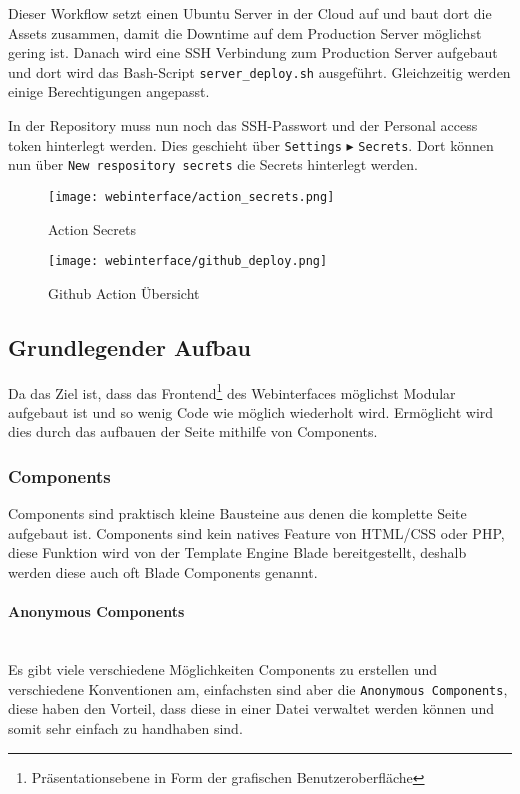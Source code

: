 Dieser Workflow setzt einen Ubuntu Server in der Cloud auf und baut dort die
Assets zusammen, damit die Downtime auf dem Production Server möglichst gering
ist. Danach wird eine SSH Verbindung zum Production Server aufgebaut und dort
wird das Bash-Script \verb|server_deploy.sh| ausgeführt. Gleichzeitig werden
einige Berechtigungen angepasst.

In der Repository muss nun noch das SSH-Passwort und der Personal access token
hinterlegt werden. Dies geschieht über \verb|Settings| $\blacktriangleright$ \verb|Secrets|. Dort
können nun über \verb|New respository secrets| die Secrets hinterlegt werden.

\begin{figure}[H]
  \centering
  \texttt{[image: webinterface/action\_secrets.png]}
  \caption{Action Secrets}
\end{figure}

\begin{figure}[H]
  \centering
  \texttt{[image: webinterface/github\_deploy.png]}
  \caption{Github Action Übersicht}
\end{figure}


\subsection{Grundlegender Aufbau}

Da das Ziel ist, dass das Frontend\footnote{Präsentationsebene in Form der
grafischen Benutzeroberfläche} des Webinterfaces möglichst Modular aufgebaut ist
und so wenig Code wie möglich wiederholt wird. Ermöglicht wird dies durch das aufbauen
der Seite mithilfe von Components.


\subsubsection{Components}

Components sind praktisch kleine Bausteine aus denen die komplette Seite
aufgebaut ist. Components sind kein natives Feature von HTML/CSS oder PHP, diese
Funktion wird von der Template Engine Blade bereitgestellt, deshalb werden diese
auch oft Blade Components genannt. 

\paragraph{Anonymous Components}\mbox{}\\

Es gibt viele verschiedene Möglichkeiten
Components zu erstellen und verschiedene Konventionen am, einfachsten sind aber
die \verb|Anonymous Components|, diese haben den Vorteil, dass diese in einer Datei
verwaltet werden können und somit sehr einfach zu handhaben sind.

